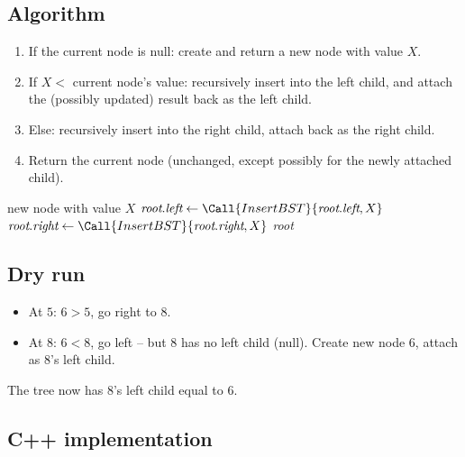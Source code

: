 \subsection*{Algorithm}

\begin{enumerate}
  \item If the current node is null: create and return a new node with
        value $X$.
  \item If $X <$ current node's value: recursively insert into the left
        child, and attach the (possibly updated) result back as the left
        child.
  \item Else: recursively insert into the right child, attach back as
        the right child.
  \item Return the current node (unchanged, except possibly for the
        newly attached child).
\end{enumerate}

\begin{algorithm}[H]
\caption{Insert into a BST}
\begin{algorithmic}[1]
    \State \Return new node with value $X$
  \EndIf
    \State $\textit{root}.\textit{left} \gets \Call{InsertBST}{\textit{root}.\textit{left}, X}$
  \Else
    \State $\textit{root}.\textit{right} \gets \Call{InsertBST}{\textit{root}.\textit{right}, X}$
  \EndIf
  \State \Return \textit{root}
\EndProcedure
\end{algorithmic}
\end{algorithm}

\subsection*{Dry run}


\begin{itemize}
  \item At $5$: $6>5$, go right to $8$.
  \item At $8$: $6<8$, go left -- but $8$ has no left child (null).
        Create new node $6$, attach as $8$'s left child.
\end{itemize}

The tree now has $8$'s left child equal to $6$.

\subsection*{C++ implementation}

